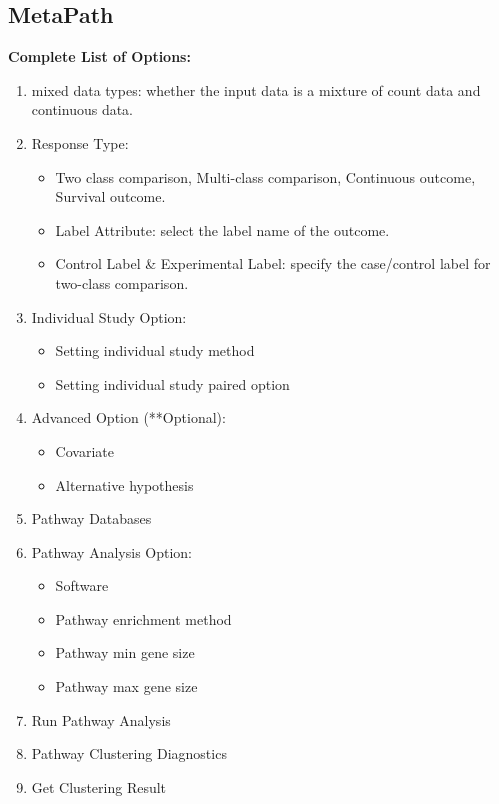 \subsection{MetaPath}
\label{sec:completeList_MetaPath}


\textbf{Complete List of Options:} 

\begin{enumerate}
  \item mixed data types: whether the input data is a mixture of count data and continuous data.
  \item Response Type:
   \begin{itemize}
     \item Two class comparison, Multi-class comparison, Continuous outcome, Survival outcome.
     \item Label Attribute: select the label name of the outcome.
     \item Control Label \& Experimental Label: specify the case/control label for two-class comparison.
    \end{itemize}
   \item Individual Study Option:
     \begin{itemize}
     \item Setting individual study method
     \item Setting individual study paired option
    \end{itemize} 
   \item Advanced Option (**Optional):
     \begin{itemize}
      \item Covariate
      \item Alternative hypothesis
    \end{itemize} 
    \item Pathway Databases
    \item Pathway Analysis Option:
         \begin{itemize}
       \item Software
      \item Pathway enrichment method
      \item Pathway min gene size
      \item Pathway max gene size
    \end{itemize} 
    \item Run Pathway Analysis
    \item Pathway Clustering Diagnostics
    \item Get Clustering Result
\end{enumerate}


